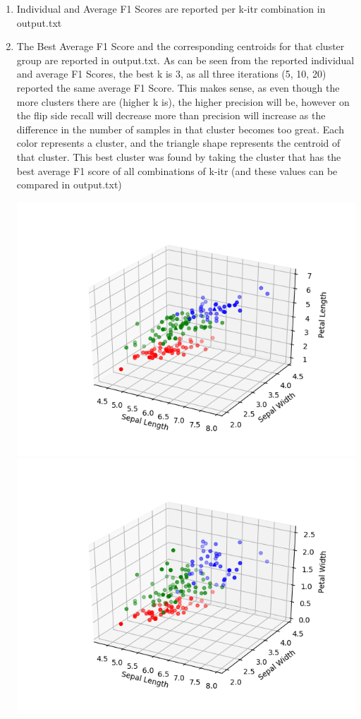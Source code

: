 \documentclass[titlepage]{article}
\begin{document}
\begin{enumerate}
	\item Individual and Average F1 Scores are reported per k-itr combination in output.txt \\
	\item The Best Average F1 Score and the corresponding centroids for that cluster group are reported in output.txt. As can be seen from the reported individual and average F1 Scores, the best k is 3, as all three iterations (5, 10, 20) reported the same average F1 Score. This makes sense, as even though the more clusters there are (higher k is), the higher precision will be, however on the flip side recall will decrease more than precision will increase as the difference in the number of samples in that cluster becomes too great. Each color represents a cluster, and the triangle shape represents the centroid of that cluster. This best cluster was found by taking the cluster that has the best average F1 score of all combinations of k-itr (and these values can be compared in output.txt)\\
		\centerline{\includegraphics[scale=0.5]{../slswpl.png} \includegraphics[scale=0.5]{../slswpw.png}}

\end{enumerate}
\end{document}
